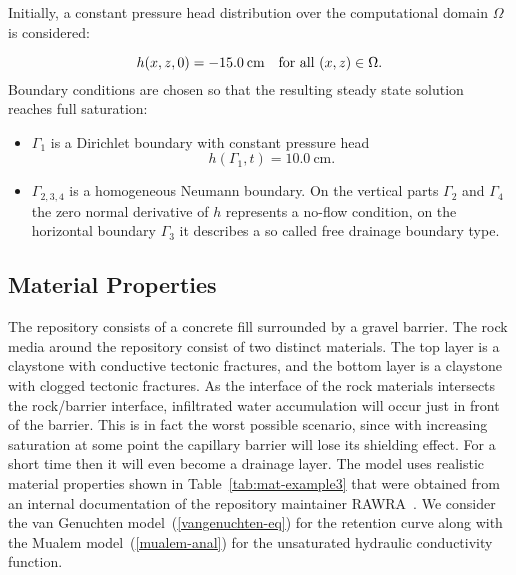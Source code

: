 \documentclass[final,3p,times,twocolumn]{elsarticle}
\begin{document}
Initially, a constant pressure head distribution over the computational domain $\Omega$ is considered:

\begin{equation}\label{ic3}
h(x,z,0) = -15.0 \hspace{0.75mm}\mbox{cm} \quad \mbox{for all } (x, z) \in \Omega.
\end{equation}
Boundary conditions are chosen so that the resulting steady state solution reaches full saturation:  

\begin{itemize}
\item $\Gamma_1$ is a Dirichlet boundary with constant pressure head $$h(\Gamma_1,t) = 10.0 \ \mbox{cm}.$$ 
\item $\Gamma_{2,3,4}$ is a homogeneous Neumann boundary. 
On the vertical parts $\Gamma_2$ and $\Gamma_4$ the zero normal derivative of $h$ 
represents a no-flow condition, on the horizontal boundary $\Gamma_3$ it describes a so called 
free drainage boundary type. %
\end{itemize}

\subsection{Material Properties}

The repository consists of a concrete fill surrounded by a gravel barrier. 
The rock media around the repository consist of two distinct materials. The 
top layer is a claystone with conductive tectonic fractures, and the bottom 
layer is a claystone  with clogged tectonic fractures. As the interface of 
the rock materials intersects the rock/barrier interface, infiltrated water 
accumulation will occur just in front of the barrier. This is in fact the worst 
possible scenario, since with increasing saturation at some point the capillary 
barrier will lose its shielding effect. For a short time then it will even become a 
drainage layer. The model uses realistic material 
properties shown in Table~\ref{tab:mat-example3} that were obtained from an
internal documentation of the repository maintainer RAWRA~\cite{rawra}. 
We consider the van Genuchten model~(\ref{vangenuchten-eq}) for the retention 
curve along with the Mualem model~(\ref{mualem-anal}) for the unsaturated hydraulic 
conductivity function.
\end{document}
